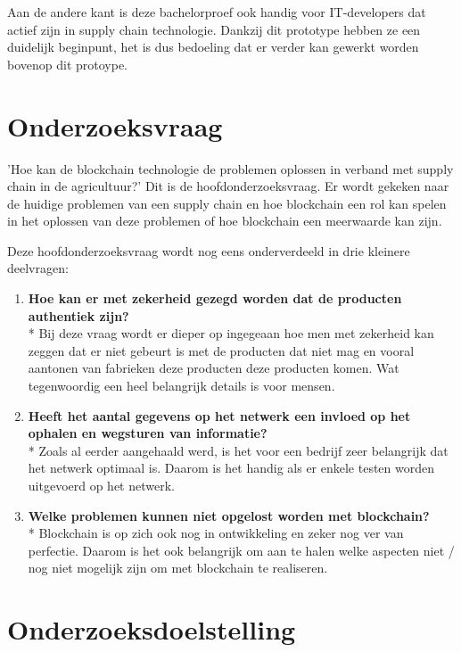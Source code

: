 Aan de andere kant is deze bachelorproef ook handig voor IT-developers dat actief zijn in supply chain technologie. Dankzij dit prototype hebben ze een duidelijk beginpunt, het is dus bedoeling dat er verder kan gewerkt worden bovenop dit protoype.

\section{Onderzoeksvraag}
\label{sec:onderzoeksvraag}

'Hoe kan de blockchain technologie de problemen oplossen in verband met supply chain in de agricultuur?' Dit is de hoofdonderzoeksvraag. Er wordt gekeken naar de huidige problemen van een supply chain en hoe blockchain een rol kan spelen in het oplossen van deze problemen of hoe blockchain een meerwaarde kan zijn.

Deze hoofdonderzoeksvraag wordt nog eens onderverdeeld in drie kleinere deelvragen:

\begin{enumerate}
	\item \textbf{Hoe kan er met zekerheid gezegd worden dat de producten authentiek zijn?}\\*
	Bij deze vraag wordt er dieper op ingegeaan hoe men met zekerheid kan zeggen dat er niet gebeurt is met de producten dat niet mag en vooral aantonen van fabrieken deze producten deze producten komen. Wat tegenwoordig een heel belangrijk details is voor mensen.
	\item \textbf{Heeft het aantal gegevens op het netwerk een invloed op het ophalen en wegsturen van informatie?}\\*
	Zoals al eerder aangehaald werd, is het voor een bedrijf zeer belangrijk dat het netwerk optimaal is. Daarom is het handig als er enkele testen worden uitgevoerd op het netwerk.
	\item \textbf{Welke problemen kunnen niet opgelost worden met blockchain?}\\*
	Blockchain is op zich ook nog in ontwikkeling en zeker nog ver van perfectie. Daarom is het ook belangrijk om aan te halen welke aspecten niet / nog niet mogelijk zijn om met blockchain te realiseren.
\end{enumerate}

\section{Onderzoeksdoelstelling}
\label{sec:onderzoeksdoelstelling}

